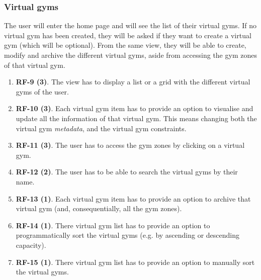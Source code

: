 \documentclass[a4paper, 12pt, oneside]{book}
\begin{document}
\subsubsection{Virtual gyms}
The user will enter the home page and will see the list of their virtual gyms. If no virtual gym has been created, they will be asked if they want to create a virtual gym (which will be optional). From the same view, they will be able to create, modify and archive the different virtual gyms, aside from accessing the gym zones of that virtual gym.
\begin{enumerate}[label = -]
	\item \textbf{RF-9 (3)}. The view has to display a list or a grid with the different virtual gyms of the user.
	\item \textbf{RF-10 (3)}. Each virtual gym item has to provide an option to visualise and update all the information of that virtual gym. This means changing both the virtual gym \emph{metadata}, and the virtual gym constraints.
	\item \textbf{RF-11 (3)}. The user has to access the gym zones by clicking on a virtual gym.
	\item \textbf{RF-12 (2)}. The user has to be able to search the virtual gyms by their name.
	\item \textbf{RF-13 (1)}. Each virtual gym item has to provide an option to archive that virtual gym (and, consequentially, all the gym zones).
	\item \textbf{RF-14 (1)}. There virtual gym list has to provide an option to programmatically sort the virtual gyms (e.g. by ascending or descending capacity).
	\item \textbf{RF-15 (1)}. There virtual gym list has to provide an option to manually sort the virtual gyms.
\end{enumerate}
\end{document}
